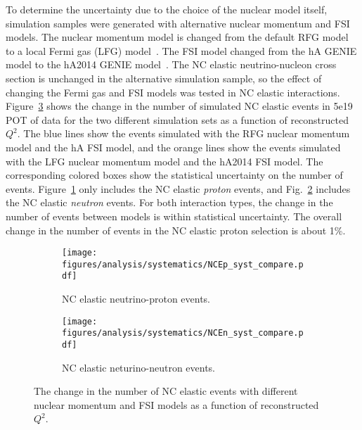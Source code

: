     To determine the uncertainty due to the choice of the nuclear model itself,
    simulation samples were generated with alternative nuclear momentum and FSI
    models. The nuclear momentum model is changed from the default RFG model to
    a local Fermi gas (LFG) model~\cite{Leitner:2008ue}. The FSI model changed
    from the hA GENIE model to the hA2014 GENIE model~\cite{Alam:2015nkk}. The
    NC elastic neutrino-nucleon cross section is unchanged in the alternative
    simulation sample, so the effect of changing the Fermi gas and FSI models
    was tested in NC elastic interactions. Figure~\ref{fig:ncfg} shows the
    change in the number of simulated NC elastic events in 5e19 POT of data for
    the two different simulation sets as a function of reconstructed $Q^2$. The
    blue lines show the events simulated with the RFG nuclear momentum model
    and the hA FSI model, and the orange lines show the events simulated with
    the LFG nuclear momentum model and the hA2014 FSI model. The corresponding
    colored boxes show the statistical uncertainty on the number of events.
    Figure~\ref{fig:ncfgp} only includes the NC elastic \textit{proton} events,
    and Fig.~\ref{fig:ncfgn} includes the NC elastic \textit{neutron} events. For
    both interaction types, the change in the number of events between models
    is within statistical uncertainty. The overall change in the number of
    events in the NC elastic proton selection is about 1\%.
    \begin{figure}[h]
      \centering
      \begin{subfigure}[t]{2.8in}
        \texttt{[image: figures/analysis/systematics/NCEp\_syst\_compare.pdf]}
        \caption{NC elastic neutrino-proton events.}
        \label{fig:ncfgp}
      \end{subfigure}
      \hspace{2pt}
      \begin{subfigure}[t]{2.8in}
        \texttt{[image: figures/analysis/systematics/NCEn\_syst\_compare.pdf]}
        \caption{NC elastic neturino-neutron events.}
        \label{fig:ncfgn}
      \end{subfigure}
      \caption{The change in the number of NC elastic events with different
      nuclear momentum and FSI models as a function of reconstructed $Q^2$.}
      \label{fig:ncfg}
    \end{figure}

